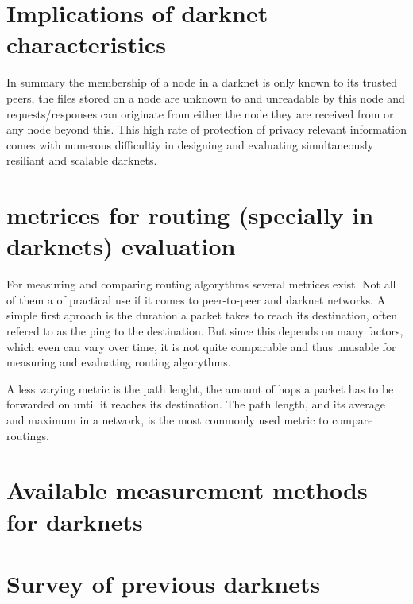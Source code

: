 \section{Implications of darknet characteristics}

In summary the membership of a node in a darknet is only known to its trusted peers, the files stored on a node are unknown to and unreadable by this node and requests/responses can originate from either the node they are received from or any node beyond this. This high rate of protection of privacy relevant information comes with numerous difficultiy in designing and evaluating simultaneously resiliant and scalable darknets.



\section{metrices for routing (specially in darknets) evaluation}

For measuring and comparing routing algorythms several metrices exist. Not all of them a of practical use if it comes to peer-to-peer and darknet networks. A simple first aproach  is the duration a packet takes to reach its destination, often refered to as the ping to the destination. But since this depends on many factors, which even can vary over time, it is not quite comparable and thus unusable for measuring and evaluating routing algorythms.

A less varying metric is the path lenght, the amount of hops a packet has to be forwarded on until it reaches its destination. The path length, and its average and maximum in a network, is the most commonly used metric to compare routings.



\section{Available measurement methods for darknets}


\section{Survey of previous darknets}


